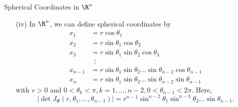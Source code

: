 \documentclass[smaller,hyperref={CJKbookmarks=true}]{beamer}
\begin{document}
\begin{frame}[t]{Spherical Coordinates in $\R^n$}
\begin{spacing}{1.1}
\begin{itemize}
  \item[(iv)] In $\R^n$, we can define spherical coordinates by
      \begin{align*}
        x_1 &=r\cos\theta_1 \\
        x_2 &=r\sin\theta_1\cos\theta_2 \\
        x_3 &=r\sin\theta_1\sin\theta_2\cos\theta_3 \\
         &\,\,\,\vdots  \\
        x_{n-1} &=r\sin\theta_1\sin\theta_2\ldots\sin\theta_{n-2}
        \cos\theta_{n-1} \\
        x_n &=r\sin\theta_1\sin\theta_2\ldots\sin\theta_{n-2}\sin\theta_{n-1}
      \end{align*}
      with $r>0$ and $0<\theta_k<\pi,k=1,\ldots,n-2,0<\theta_{n-1}<2\pi$. Here,
      \[|\det J_\Phi(r,\theta_1,\ldots,\theta_{n-1})|=r^{n-1}\sin^{n-2}\theta_1
      \sin^{n-3}\theta_2\ldots\sin\theta_{n-1}.\]
\end{itemize}
\end{spacing}
\end{frame}
\end{document}
